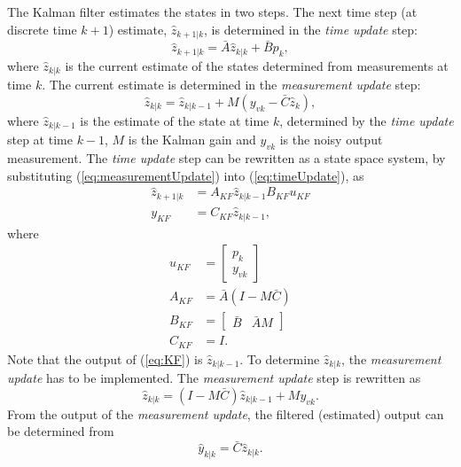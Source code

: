\documentclass[12pt]{article}
\begin{document}
The Kalman filter estimates the states in two steps. The next time step (at discrete time $k+1$) estimate, $\hat{z}_{k+1|k}$, is determined in the \textit{time update} step:
\begin{equation}
\hat{z}_{k+1|k} = \bar{A} \hat{z}_{k|k} + \bar{B} p_k, \label{eq:timeUpdate}
\end{equation}
where $ \hat{z}_{k|k} $ is the current estimate of the states determined from measurements at time $k$. The current estimate is determined in the \textit{measurement update} step:
\begin{equation}
\hat{z}_{k|k} = \hat{z}_{k|k-1} + M (y_{vk} - \bar{C} \hat{z}_k), \label{eq:measurementUpdate}
\end{equation}
where $ \hat{z}_{k|k-1} $ is the estimate of the state at time $k$, determined by the \textit{time update} step at time $k-1$, $ M $ is the Kalman gain and $ y_{vk} $ is the noisy output measurement. The \textit{time update} step can be rewritten as a state space system, by substituting (\ref{eq:measurementUpdate}) into (\ref{eq:timeUpdate}), as
\begin{subequations}
\begin{align}
\hat{z}_{k+1|k} &= A_{KF} \hat{z}_{k|k-1} B_{KF} u_{KF} \\
y_{KF} &= C_{KF} \hat{z}_{k|k-1},
\end{align} \label{eq:KF}
\end{subequations}
where 
\begin{subequations}
\begin{align}
u_{KF} &= \begin{bmatrix} p_k \\ y_{vk} \end{bmatrix} \\
A_{KF} &= \bar{A}(I-M\bar{C}) \\
B_{KF} &= \begin{bmatrix} \bar{B} & \bar{A}M \end{bmatrix} \\
C_{KF} &= I.
\end{align}
\end{subequations}
Note that the output of (\ref{eq:KF}) is $ \hat{z}_{k|k-1} $. To determine $ \hat{z}_{k|k} $, the \textit{measurement update} has to be implemented. The \textit{measurement update} step is rewritten as
\begin{equation}
\hat{z}_{k|k} = (I-M \bar{C})\hat{z}_{k|k-1} + M y_{vk}.
\end{equation}
From the output of the \textit{measurement update}, the filtered (estimated) output can be determined from
\begin{equation}
\hat{y}_{k|k} = \bar{C} \hat{z}_{k|k}. \label{eq:KFOutput}
\end{equation}
\end{document}
